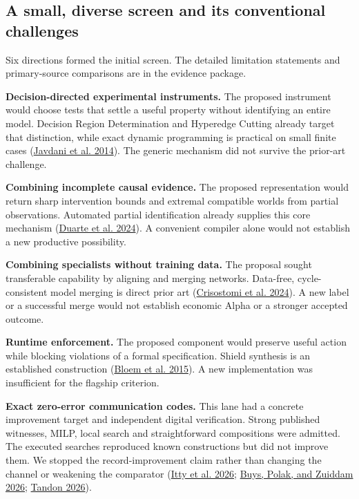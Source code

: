 \documentclass[11pt,a4paper]{article}
\begin{document}

\hypertarget{a-small-diverse-screen-and-its-conventional-challenges}{%
\subsection{A small, diverse screen and its conventional
challenges}\label{a-small-diverse-screen-and-its-conventional-challenges}}

Six directions formed the initial screen. The detailed limitation
statements and primary-source comparisons are in the evidence package.

\textbf{Decision-directed experimental instruments.} The proposed
instrument would choose tests that settle a useful property without
identifying an entire model. Decision Region Determination and Hyperedge
Cutting already target that distinction, while exact dynamic programming
is practical on small finite cases
(\protect\hyperlink{ref-javdani2014}{Javdani et al. 2014}). The generic
mechanism did not survive the prior-art challenge.

\textbf{Combining incomplete causal evidence.} The proposed
representation would return sharp intervention bounds and extremal
compatible worlds from partial observations. Automated partial
identification already supplies this core mechanism
(\protect\hyperlink{ref-duarte2024}{Duarte et al. 2024}). A convenient
compiler alone would not establish a new productive possibility.

\textbf{Combining specialists without training data.} The proposal
sought transferable capability by aligning and merging networks.
Data-free, cycle-consistent model merging is direct prior art
(\protect\hyperlink{ref-crisostomi2024}{Crisostomi et al. 2024}). A new
label or a successful merge would not establish economic Alpha or a
stronger accepted outcome.

\textbf{Runtime enforcement.} The proposed component would preserve
useful action while blocking violations of a formal specification.
Shield synthesis is an established construction
(\protect\hyperlink{ref-bloem2015}{Bloem et al. 2015}). A new
implementation was insufficient for the flagship criterion.

\textbf{Exact zero-error communication codes.} This lane had a concrete
improvement target and independent digital verification. Strong
published witnesses, MILP, local search and straightforward compositions
were admitted. The executed searches reproduced known constructions but
did not improve them. We stopped the record-improvement claim rather
than changing the channel or weakening the comparator
(\protect\hyperlink{ref-itty2026}{Itty et al. 2026};
\protect\hyperlink{ref-buys2026}{Buys, Polak, and Zuiddam 2026};
\protect\hyperlink{ref-tandon2026}{Tandon 2026}).
\end{document}
